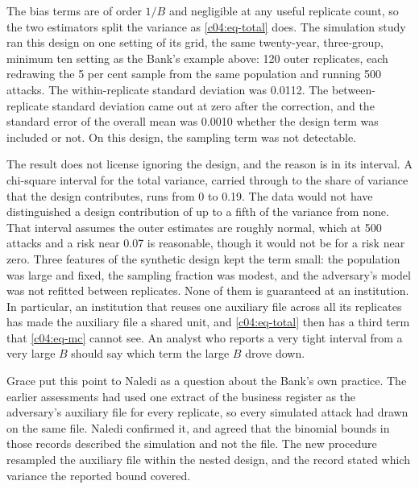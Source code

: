 The bias terms are of order $1/B$ and negligible at any useful replicate count, so the
two estimators split the variance as \eqref{c04:eq-total} does. The simulation study ran
this design on one setting of its grid, the same twenty-year, three-group, minimum ten
setting as the Bank's example above: 120 outer replicates, each redrawing the 5 per cent
sample from the same population and running 500 attacks.
The within-replicate standard deviation was 0.0112. The between-replicate standard
deviation came out at zero after the correction, and the standard error of the overall
mean was 0.0010 whether the design term was included or not.
On this design, the sampling term was not detectable.

The result does not license ignoring the design, and the reason is in its interval. A
chi-square interval for the total variance, carried through to the share of variance
that the design contributes, runs from 0 to 0.19.
The data would not have distinguished a design contribution of up to a fifth of the
variance from none. That interval assumes the outer estimates are roughly normal, which at 500 attacks and
a risk near 0.07 is reasonable, though it would not be for a risk near zero.
Three features of the synthetic design kept the term small: the population was large and
fixed, the sampling fraction was modest, and the adversary's model was not refitted
between replicates. None of them is guaranteed at an institution. In particular, an
institution that reuses one auxiliary file across all its replicates has made the
auxiliary file a shared unit, and \eqref{c04:eq-total} then has a third term that
\eqref{c04:eq-mc} cannot see. An analyst who reports a very tight interval from a very large $B$ should say which term
the large $B$ drove down.

Grace put this point to Naledi as a question about the Bank's own practice. The earlier
assessments had used one extract of the business register as the adversary's auxiliary
file for every replicate, so every simulated attack had drawn on the same file. Naledi
confirmed it, and agreed that the binomial bounds in those records described the
simulation and not the file. The new procedure resampled the auxiliary file within the
nested design, and the record stated which variance the reported bound covered.

